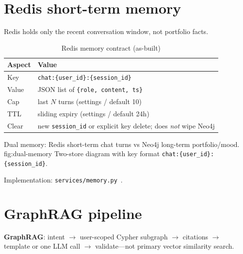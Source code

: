 \section{Redis short-term memory}

Redis holds only the recent conversation window, not portfolio facts.

\begin{table}[!htbp]
\centering
\small
\caption{Redis memory contract (as-built)}
\label{tab:redis-mem}
\begin{tabularx}{\textwidth}{@{}
  >{\raggedright\arraybackslash}p{}
  >{\raggedright\arraybackslash}X
  @{}}
\toprule
\textbf{Aspect} & \textbf{Value} \\
\midrule
Key & \texttt{chat:\{user\_id\}:\{session\_id\}} \\
\addlinespace
Value & JSON list of \texttt{\{role, content, ts\}} \\
\addlinespace
Cap & last $N$ turns (settings / default 10) \\
\addlinespace
TTL & sliding expiry (settings / default 24h) \\
\addlinespace
Clear & new \texttt{session\_id} or explicit key delete; does \emph{not} wipe Neo4j \\
\bottomrule
\end{tabularx}
\end{table}

%
{Dual memory: Redis short-term chat turns vs Neo4j long-term portfolio/mood.}%
{fig:dual-memory}%
{Two-store diagram with key format \texttt{chat:\{user\_id\}:\{session\_id\}}.}

\noindent
Implementation: \texttt{services/memory.py}~\cite{prd}.

\section{GraphRAG pipeline}

\textbf{GraphRAG}: intent $\rightarrow$ user-scoped Cypher subgraph $\rightarrow$ citations $\rightarrow$ template or one LLM call $\rightarrow$ validate---not primary vector similarity search.

